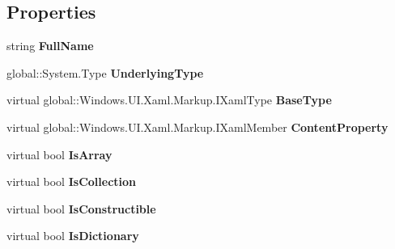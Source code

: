 \subsection*{Properties}
\begin{DoxyCompactItemize}
\item 
\mbox{\label{class_r_f_storage_1_1_r_f_storage___xaml_type_info_1_1_xaml_system_base_type_a5bd25aef0eb46bff08d4e9b055096d07}} 
string {\bfseries Full\+Name}\hspace{0.3cm}{\ttfamily  [get]}
\item 
\mbox{\label{class_r_f_storage_1_1_r_f_storage___xaml_type_info_1_1_xaml_system_base_type_a1ed74ccb2e92e9d987be98cc7b530fb7}} 
global\+::\+System.\+Type {\bfseries Underlying\+Type}\hspace{0.3cm}{\ttfamily  [get]}
\item 
\mbox{\label{class_r_f_storage_1_1_r_f_storage___xaml_type_info_1_1_xaml_system_base_type_a9a5eca8479ca8b2bc5e4e9921ba13409}} 
virtual global\+::\+Windows.\+U\+I.\+Xaml.\+Markup.\+I\+Xaml\+Type {\bfseries Base\+Type}\hspace{0.3cm}{\ttfamily  [get]}
\item 
\mbox{\label{class_r_f_storage_1_1_r_f_storage___xaml_type_info_1_1_xaml_system_base_type_aae652bb356a5ec46d83539c214ee98c0}} 
virtual global\+::\+Windows.\+U\+I.\+Xaml.\+Markup.\+I\+Xaml\+Member {\bfseries Content\+Property}\hspace{0.3cm}{\ttfamily  [get]}
\item 
\mbox{\label{class_r_f_storage_1_1_r_f_storage___xaml_type_info_1_1_xaml_system_base_type_a8e2f2300d6fbb5a1be685ad08a89dee6}} 
virtual bool {\bfseries Is\+Array}\hspace{0.3cm}{\ttfamily  [get]}
\item 
\mbox{\label{class_r_f_storage_1_1_r_f_storage___xaml_type_info_1_1_xaml_system_base_type_a991f4693d7c683a1a92606290b29f128}} 
virtual bool {\bfseries Is\+Collection}\hspace{0.3cm}{\ttfamily  [get]}
\item 
\mbox{\label{class_r_f_storage_1_1_r_f_storage___xaml_type_info_1_1_xaml_system_base_type_a199dc94a6c916da10b9ef6d90acf8a27}} 
virtual bool {\bfseries Is\+Constructible}\hspace{0.3cm}{\ttfamily  [get]}
\item 
\mbox{\label{class_r_f_storage_1_1_r_f_storage___xaml_type_info_1_1_xaml_system_base_type_ae16aaddd3a7513f2ce3242331de60e14}} 
virtual bool {\bfseries Is\+Dictionary}\hspace{0.3cm}{\ttfamily  [get]}

\end{DoxyCompactItemize}
